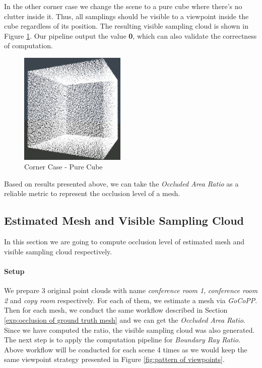 \documentclass[11pt, a4paper,oneside,chapterprefix=false]{scrbook}
\begin{document}
In the other corner case we change the scene to a pure cube where there's no clutter inside it. Thus, all samplings should be visible to a viewpoint inside the cube regardless of its position. The resulting visible sampling cloud is shown in Figure \ref{fig:corner case pure cube}. Our pipeline output the value \textbf{0}, which can also validate the correctness of computation. 

\vspace{10pt}

\begin{figure}[H]
    \centering
    \includegraphics*[width=0.45\textwidth]{figures/cube with all samples.png}
    \caption{Corner Case - Pure Cube}
    \label{fig:corner case pure cube}
\end{figure}

Based on results presented above, we can take the \textit{Occluded Area Ratio} as a reliable metric to represent the occlusion level of a mesh.

\subsection{Estimated Mesh and Visible Sampling Cloud}

In this section we are going to compute occlusion level of estimated mesh and visible sampling cloud respectively. 

\paragraph{Setup}

We prepare 3 original point clouds with name \textit{conference room 1}, \textit{conference room 2} and \textit{copy room} respectively. For each of them, we estimate a mesh via \textit{GoCoPP}. Then for each mesh, we conduct the same workflow described in Section \ref{exp:occlusion of ground truth mesh} and we can get the \textit{Occluded Area Ratio}. Since we have computed the ratio, the visible sampling cloud was also generated. The next step is to apply the computation pipeline for \textit{Boundary Ray Ratio}. Above workflow will be conducted for each scene 4 times as we would keep the same viewpoint strategy presented in Figure \ref{fig:pattern of viewpoints}.    
\end{document}
